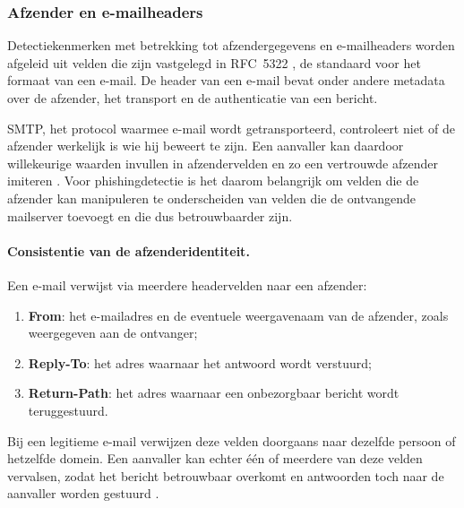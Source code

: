 \subsubsection{Afzender en e-mail\-headers}
\label{subsubsec:Afzender en e-mailheaders}

Detectiekenmerken met betrekking tot afzendergegevens en e-mailheaders worden afgeleid uit velden die zijn vastgelegd in RFC~5322 \autocite{Resnick2008}, de standaard voor het formaat van een e-mail. De header van een e-mail bevat onder andere metadata over de afzender, het transport en de authenticatie van een bericht. 

SMTP, het protocol waarmee e-mail wordt getransporteerd, controleert niet of de afzender werkelijk is wie hij beweert te zijn. Een aanvaller kan daardoor willekeurige waarden invullen in afzendervelden en zo een vertrouwde afzender imiteren \autocite{Hu2018}. Voor phishingdetectie is het daarom belangrijk om velden die de afzender kan manipuleren te onderscheiden van velden die de ontvangende mailserver toevoegt en die dus betrouwbaarder zijn.

\paragraph{Consistentie van de afzenderidentiteit.}
Een e-mail verwijst via meerdere headervelden naar een afzender: 
\begin{enumerate}
    \item \textbf{From}: het e-mailadres en de eventuele weergavenaam van de afzender, zoals weergegeven aan de ontvanger;
    \item \textbf{Reply-To}: het adres waarnaar het antwoord wordt verstuurd;
    \item \textbf{Return-Path}: het adres waarnaar een onbezorgbaar bericht wordt teruggestuurd. 
\end{enumerate}

Bij een legitieme e-mail verwijzen deze velden doorgaans naar dezelfde persoon of hetzelfde domein. Een aanvaller kan echter één of meerdere van deze velden vervalsen, zodat het bericht betrouwbaar overkomt en antwoorden toch naar de aanvaller worden gestuurd \autocite{Hu2018}.

